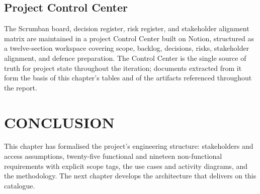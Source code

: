 \subsection{Project Control Center}
The Scrumban board, decision register, risk register, and stakeholder
alignment matrix are maintained in a project Control Center built on
Notion, structured as a twelve-section workspace covering scope,
backlog, decisions, risks, stakeholder alignment, and defence
preparation. The Control Center is the single source of truth for
project state throughout the iteration; documents extracted from it
form the basis of this chapter's tables and of the artifacts
referenced throughout the report.

\section*{CONCLUSION}
This chapter has formalised the project's engineering structure: stakeholders and access assumptions, twenty-five functional and nineteen non-functional requirements with explicit scope tags, the use cases and activity diagrams, and the methodology. The next chapter develops the architecture that delivers on this catalogue.
